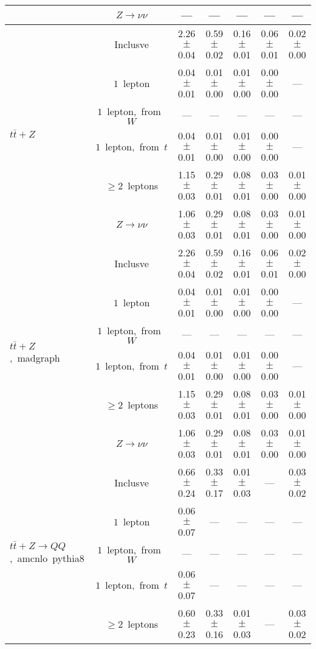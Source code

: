 \documentclass{article}
\begin{document}
\begin{longtable}{|l|c|c|c|c|c|c|}
 & $Z\rightarrow\nu\nu$  & ---  & ---  & ---  & ---  & --- \\* 
\hline 
\multirow{6}{*}{$t\bar{t}+Z$} & Inclusve  & 2.26 $\pm$ 0.04  & 0.59 $\pm$ 0.02  & 0.16 $\pm$ 0.01  & 0.06 $\pm$ 0.01  & 0.02 $\pm$ 0.00 \\* 
 & $1$~lepton  & 0.04 $\pm$ 0.01  & 0.01 $\pm$ 0.00  & 0.01 $\pm$ 0.00  & 0.00 $\pm$ 0.00  & --- \\* 
 & $1$~lepton,~from~$W$  & ---  & ---  & ---  & ---  & --- \\* 
 & $1$~lepton,~from~$t$  & 0.04 $\pm$ 0.01  & 0.01 $\pm$ 0.00  & 0.01 $\pm$ 0.00  & 0.00 $\pm$ 0.00  & --- \\* 
 & $\ge2$~leptons  & 1.15 $\pm$ 0.03  & 0.29 $\pm$ 0.01  & 0.08 $\pm$ 0.01  & 0.03 $\pm$ 0.00  & 0.01 $\pm$ 0.00 \\* 
 & $Z\rightarrow\nu\nu$  & 1.06 $\pm$ 0.03  & 0.29 $\pm$ 0.01  & 0.08 $\pm$ 0.01  & 0.03 $\pm$ 0.00  & 0.01 $\pm$ 0.00 \\* 
\hline 
\multirow{6}{*}{$t\bar{t}+Z$,~madgraph} & Inclusve  & 2.26 $\pm$ 0.04  & 0.59 $\pm$ 0.02  & 0.16 $\pm$ 0.01  & 0.06 $\pm$ 0.01  & 0.02 $\pm$ 0.00 \\* 
 & $1$~lepton  & 0.04 $\pm$ 0.01  & 0.01 $\pm$ 0.00  & 0.01 $\pm$ 0.00  & 0.00 $\pm$ 0.00  & --- \\* 
 & $1$~lepton,~from~$W$  & ---  & ---  & ---  & ---  & --- \\* 
 & $1$~lepton,~from~$t$  & 0.04 $\pm$ 0.01  & 0.01 $\pm$ 0.00  & 0.01 $\pm$ 0.00  & 0.00 $\pm$ 0.00  & --- \\* 
 & $\ge2$~leptons  & 1.15 $\pm$ 0.03  & 0.29 $\pm$ 0.01  & 0.08 $\pm$ 0.01  & 0.03 $\pm$ 0.00  & 0.01 $\pm$ 0.00 \\* 
 & $Z\rightarrow\nu\nu$  & 1.06 $\pm$ 0.03  & 0.29 $\pm$ 0.01  & 0.08 $\pm$ 0.01  & 0.03 $\pm$ 0.00  & 0.01 $\pm$ 0.00 \\* 
\hline 
\multirow{6}{*}{$t\bar{t}+Z{\rightarrow}QQ$,~amcnlo~pythia8} & Inclusve  & 0.66 $\pm$ 0.24  & 0.33 $\pm$ 0.17  & 0.01 $\pm$ 0.03  & ---  & 0.03 $\pm$ 0.02 \\* 
 & $1$~lepton  & 0.06 $\pm$ 0.07  & ---  & ---  & ---  & --- \\* 
 & $1$~lepton,~from~$W$  & ---  & ---  & ---  & ---  & --- \\* 
 & $1$~lepton,~from~$t$  & 0.06 $\pm$ 0.07  & ---  & ---  & ---  & --- \\* 
 & $\ge2$~leptons  & 0.60 $\pm$ 0.23  & 0.33 $\pm$ 0.16  & 0.01 $\pm$ 0.03  & ---  & 0.03 $\pm$ 0.02 \\* 

\end{longtable}
\end{document}

